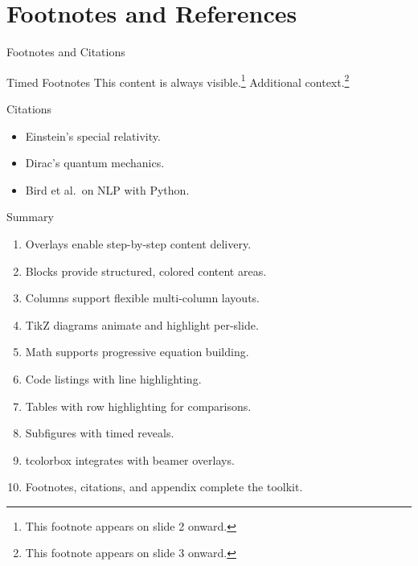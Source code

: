 \documentclass[doctype=beamer, beameraspectratio=169, beamertheme=Madrid, institution=generic]{omnilatex}
\begin{document}
\section{Footnotes and References}
\begin{frame}{Footnotes and Citations}
  \begin{block}{Timed Footnotes}
    This content is always visible.\footnote<2->{This footnote appears on slide 2 onward.}
    Additional context.\footnote<3->{This footnote appears on slide 3 onward.}
  \end{block}
  \vspace{1em}
  \begin{block}{Citations}
    \begin{itemize}
      \item Einstein's special relativity\cite{einstein1905}.
      \item Dirac's quantum mechanics\cite{diracPrinciplesQuantumMechanics1981}.
      \item Bird et al.\ on NLP with Python\cite{birdNaturalLanguageProcessing2009}.
    \end{itemize}
  \end{block}
  \vspace{1em}
  \begin{center}
    \small
    \printbibliography[heading=none]
  \end{center}
\end{frame}

\begin{frame}{Summary}
  \begin{enumerate}
    \item Overlays enable step-by-step content delivery.
    \item Blocks provide structured, colored content areas.
    \item Columns support flexible multi-column layouts.
    \item TikZ diagrams animate and highlight per-slide.
    \item Math supports progressive equation building.
    \item Code listings with line highlighting.
    \item Tables with row highlighting for comparisons.
    \item Subfigures with timed reveals.
    \item tcolorbox integrates with beamer overlays.
    \item Footnotes, citations, and appendix complete the toolkit.
  \end{enumerate}
\end{frame}
\end{document}
